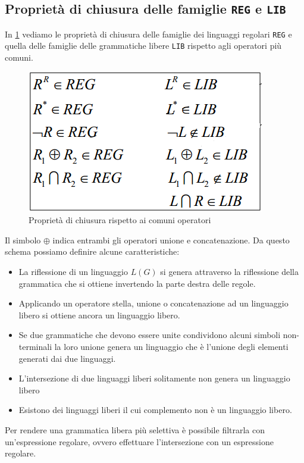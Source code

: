 \subsection{Proprietà di chiusura delle famiglie \texttt{REG} e \texttt{LIB}}
In \figurename \ref{fig:chiusura} vediamo le proprietà di chiusura delle famiglie dei linguaggi regolari \texttt{REG} e quella delle famiglie delle grammatiche libere \texttt{LIB} rispetto agli operatori più comuni.
\begin{figure}
	\centering
	\includegraphics[width=0.4\linewidth]{img/chiusura.png}
	\caption{Proprietà di chiusura rispetto ai comuni operatori}\label{fig:chiusura}
\end{figure}
Il simbolo $ \oplus $ indica entrambi gli operatori unione e concatenazione.
Da questo schema possiamo definire alcune caratteristiche:
\begin{itemize}
	\item La riflessione di un linguaggio $ L(G) $ si genera attraverso la riflessione della grammatica che si ottiene invertendo la parte destra delle regole.
	\item Applicando un operatore stella, unione o concatenazione ad un linguaggio libero si ottiene ancora un linguaggio libero.
	\item Se due grammatiche che devono essere unite condividono alcuni simboli non-terminali la loro unione genera un linguaggio che è l'unione degli elementi generati dai due linguaggi.
	\item L'intersezione di due linguaggi liberi solitamente non genera un linguaggio libero
	\item Esistono dei linguaggi liberi il cui complemento non è un linguaggio libero.
\end{itemize}
Per rendere una grammatica libera più selettiva è possibile filtrarla con un'espressione regolare, ovvero effettuare l'intersezione con un espressione regolare.
